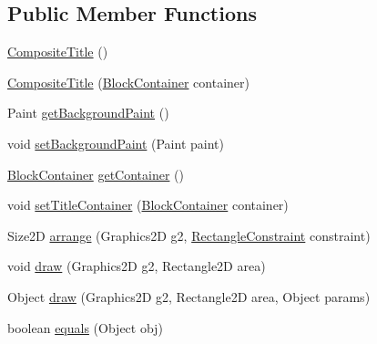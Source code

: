 \subsection*{Public Member Functions}
\begin{DoxyCompactItemize}
\item 
\mbox{\hyperlink{classorg_1_1jfree_1_1chart_1_1title_1_1_composite_title_a09aded3ba50f736b7396d87335bbb04f}{Composite\+Title}} ()
\item 
\mbox{\hyperlink{classorg_1_1jfree_1_1chart_1_1title_1_1_composite_title_a40b1bf3e44816cf7e6d1dc3ce925610c}{Composite\+Title}} (\mbox{\hyperlink{classorg_1_1jfree_1_1chart_1_1block_1_1_block_container}{Block\+Container}} container)
\item 
Paint \mbox{\hyperlink{classorg_1_1jfree_1_1chart_1_1title_1_1_composite_title_a3084592a677baf19b90e185e55e61abc}{get\+Background\+Paint}} ()
\item 
void \mbox{\hyperlink{classorg_1_1jfree_1_1chart_1_1title_1_1_composite_title_a64773459321bd611e3f2588a045f97cb}{set\+Background\+Paint}} (Paint paint)
\item 
\mbox{\hyperlink{classorg_1_1jfree_1_1chart_1_1block_1_1_block_container}{Block\+Container}} \mbox{\hyperlink{classorg_1_1jfree_1_1chart_1_1title_1_1_composite_title_a7cd67d3f5cd85f6cc17ad311c58897fe}{get\+Container}} ()
\item 
void \mbox{\hyperlink{classorg_1_1jfree_1_1chart_1_1title_1_1_composite_title_aa780f0cc2f4a2301a7440c9b8c8b3c07}{set\+Title\+Container}} (\mbox{\hyperlink{classorg_1_1jfree_1_1chart_1_1block_1_1_block_container}{Block\+Container}} container)
\item 
Size2D \mbox{\hyperlink{classorg_1_1jfree_1_1chart_1_1title_1_1_composite_title_a9f7d9c67faefcc8745d73da575bf731f}{arrange}} (Graphics2D g2, \mbox{\hyperlink{classorg_1_1jfree_1_1chart_1_1block_1_1_rectangle_constraint}{Rectangle\+Constraint}} constraint)
\item 
void \mbox{\hyperlink{classorg_1_1jfree_1_1chart_1_1title_1_1_composite_title_aee7f0d6bc25159e4afba020c4621fa7c}{draw}} (Graphics2D g2, Rectangle2D area)
\item 
Object \mbox{\hyperlink{classorg_1_1jfree_1_1chart_1_1title_1_1_composite_title_aba3d4ae99c4cebc28b67ca69893bfe83}{draw}} (Graphics2D g2, Rectangle2D area, Object params)
\item 
boolean \mbox{\hyperlink{classorg_1_1jfree_1_1chart_1_1title_1_1_composite_title_a0f2766e98246847463c031805a660b9e}{equals}} (Object obj)
\end{DoxyCompactItemize}
